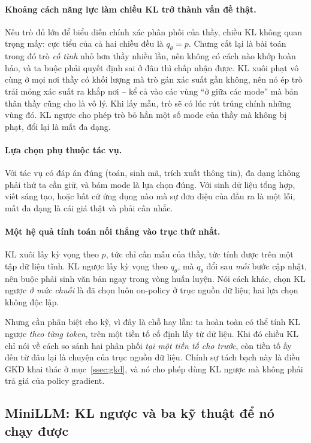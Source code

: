 \paragraph{Khoảng cách năng lực làm chiều KL trở thành vấn đề thật.} Nếu trò đủ lớn để biểu diễn chính xác phân phối của thầy, chiều KL không quan trọng mấy: cực tiểu của cả hai chiều đều là $q_\theta = p$. Chưng cất lại là bài toán trong đó trò \emph{cố tình} nhỏ hơn thầy nhiều lần, nên không có cách nào khớp hoàn hảo, và ta buộc phải quyết định sai ở đâu thì chấp nhận được. KL xuôi phạt vô cùng ở mọi nơi thầy có khối lượng mà trò gán xác suất gần không, nên nó ép trò trải mỏng xác suất ra khắp nơi -- kể cả vào các vùng ``ở giữa các mode'' mà bản thân thầy cũng cho là vô lý. Khi lấy mẫu, trò sẽ có lúc rút trúng chính những vùng đó. KL ngược cho phép trò bỏ hẳn một số mode của thầy mà không bị phạt, đổi lại là mất đa dạng.

\paragraph{Lựa chọn phụ thuộc tác vụ.} Với tác vụ có đáp án đúng (toán, sinh mã, trích xuất thông tin), đa dạng không phải thứ ta cần giữ, và bám mode là lựa chọn đúng. Với sinh dữ liệu tổng hợp, viết sáng tạo, hoặc bất cứ ứng dụng nào mà sự đơn điệu của đầu ra là một lỗi, mất đa dạng là cái giá thật và phải cân nhắc.

\paragraph{Một hệ quả tính toán nối thẳng vào trục thứ nhất.} KL xuôi lấy kỳ vọng theo $p$, tức chỉ cần mẫu của thầy, tức tính được trên một tập dữ liệu tĩnh. KL ngược lấy kỳ vọng theo $q_\theta$, mà $q_\theta$ đổi sau \emph{mỗi} bước cập nhật, nên buộc phải sinh văn bản ngay trong vòng huấn luyện. Nói cách khác, chọn KL ngược \emph{ở mức chuỗi} là đã chọn luôn on-policy ở trục nguồn dữ liệu; hai lựa chọn không độc lập.

Nhưng cần phân biệt cho kỹ, vì đây là chỗ hay lẫn: ta hoàn toàn có thể tính KL ngược \emph{theo từng token}, trên một tiền tố cố định lấy từ dữ liệu. Khi đó chiều KL chỉ nói về cách so sánh hai phân phối \emph{tại một tiền tố cho trước}, còn tiền tố ấy đến từ đâu lại là chuyện của trục nguồn dữ liệu. Chính sự tách bạch này là điều GKD khai thác ở mục~\ref{ssec:gkd}, và nó cho phép dùng KL ngược mà không phải trả giá của policy gradient.

\subsection{MiniLLM: KL ngược và ba kỹ thuật để nó chạy được}
\label{ssec:minillm}

